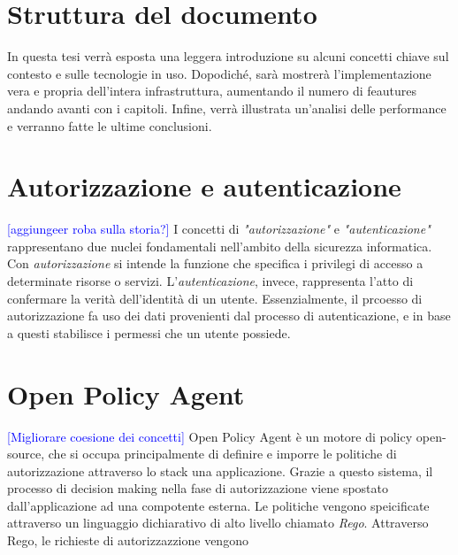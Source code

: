\section{Struttura del documento}
In questa tesi verrà esposta una leggera introduzione su alcuni concetti chiave sul contesto e sulle tecnologie in uso. 
Dopodiché, sarà mostrerà l'implementazione vera e propria dell'intera infrastruttura, aumentando il numero di feautures andando avanti
con i capitoli. Infine, verrà illustrata un'analisi delle performance e verranno fatte le ultime conclusioni.  

\section{Autorizzazione e autenticazione}
\textcolor{blue}{[aggiungeer roba sulla storia?]}
I concetti di \textit{"autorizzazione"} e \textit{"autenticazione"} rappresentano due nuclei fondamentali nell'ambito 
della sicurezza informatica. Con \textit{autorizzazione} si intende la funzione che specifica i privilegi di accesso a determinate risorse o servizi. 
L'\textit{autenticazione}, invece, rappresenta l'atto di confermare la verità dell'identità di un utente.
Essenzialmente, il prcoesso di autorizzazione fa uso dei dati provenienti dal processo di autenticazione, e in base a questi stabilisce i 
permessi che un utente possiede.

\section{Open Policy Agent}
\textcolor{blue}{[Migliorare coesione dei concetti]}
Open Policy Agent è un motore di policy open-source, che si occupa principalmente di definire e imporre le politiche di autorizzazione attraverso lo stack una applicazione.
Grazie a questo sistema, il processo di decision making nella fase di autorizzazione viene spostato dall'applicazione ad una compotente esterna. 
\newline
Le politiche vengono speicificate attraverso un linguaggio dichiarativo di alto livello chiamato \textit{Rego}.
Attraverso Rego, le richieste di autorizzazzione vengono 